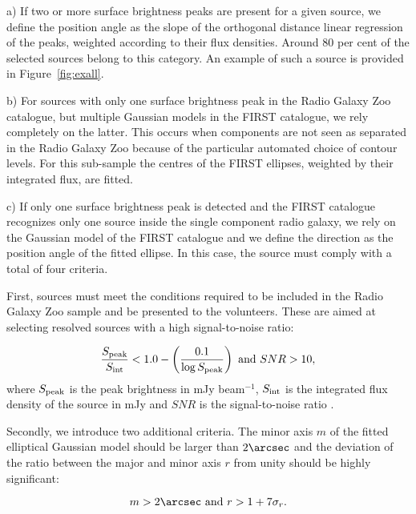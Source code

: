 			\begin{description}
			\item a)  If two or more surface brightness peaks are present for a given source, we define the position angle as the slope of the orthogonal distance linear regression of the peaks, weighted according to their flux densities. Around $80$ per cent of the selected sources belong to this category. An example of such a source is provided in Figure~\ref{fig:exall}.
			
			
			\item b) For sources with only one surface brightness peak in the Radio Galaxy Zoo catalogue, but multiple Gaussian models in the FIRST catalogue, we rely completely on the latter.
			This occurs when components are not seen as separated in the Radio Galaxy Zoo because of the particular automated choice of contour levels. For this sub-sample the centres of the FIRST ellipses, weighted by their integrated flux, are fitted.
			
			\item c) 	If only one surface brightness peak is detected and the FIRST catalogue recognizes only one source inside the single component radio galaxy, we rely on the Gaussian model of the FIRST catalogue and we define the direction as the position angle of the fitted ellipse. In this case, the source must comply with a total of four criteria.
			
			First, sources must meet the conditions required to be included in the Radio Galaxy Zoo sample and be presented to the volunteers. These are aimed at selecting resolved sources with a high signal-to-noise ratio:
			
			\begin{equation}
			\frac{S_{\rm{peak}}}{S_{\rm{int}}} < 1.0 - \left( \frac{0.1}{\log S_{\rm{peak}}}\right) \textrm{ and } SNR>10,
			\label{eq:cond1}
			\end{equation} 
			where $S_{\rm{peak}}$ is the peak brightness in mJy beam$^{-1}$, $S_{\rm{int}}$ is the integrated flux density of the source in mJy and $SNR$ is the signal-to-noise ratio \citep{Banfield2015}.
			
			Secondly, we introduce two additional criteria. The minor axis $m$ of the fitted elliptical Gaussian model should be larger than $2\arcsec$ and the deviation of the ratio between the major and minor axis $r$ from unity should be highly significant:
			
			
			\begin{equation}
			m > 2\arcsec
			\textrm{ and }
			r > 1 + 7\sigma_r.
			\label{eq:cond2}
			\end{equation}
			

\end{description}
